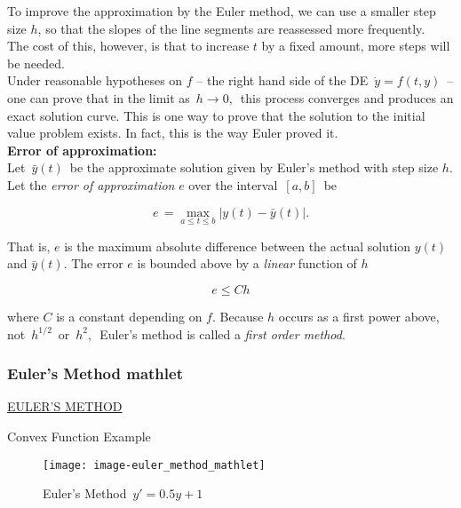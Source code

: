 To improve the approximation by the Euler method, we can use a smaller step size $h$,
so that the slopes of the line segments are reassessed more frequently. \\

The cost of this, however, is that to increase $t$ by a fixed amount, more steps will be needed. \\

Under reasonable hypotheses on $f$ – the right hand side of the DE $\, \dot y= f(t,y) \,$
– one can prove that in the limit as $\, h \to 0,\,$ this process converges and produces
an exact solution curve.
This is one way to prove that the solution to the initial value problem exists.
In fact, this is the way Euler proved it.\\

\textbf{Error of approximation:}\\
Let $\, \bar{y}(t)\,$ be the approximate solution given by Euler's method with step size $h$.\\
Let the \emph{\color{blue} error of approximation} $e$
over the interval $\, [a,b] \,$ be

\begin{equation*}
  e\, = \max _{a\leq t\leq b} \left|y(t)-\bar{y}(t)\right|.
\end{equation*}

That is, $e$ is the maximum absolute difference between the actual solution
$y(t)$ and $\bar{y} (t)$. The error $e$ is bounded above by a \emph{linear} function of $h$

\begin{equation*}
  e\leq C h
\end{equation*}

where $C$ is a constant depending on $f$.
Because $h$ occurs as a first power above, not $\, h^{1/2}\,$ or $\, h^2,\,$
Euler's method is called a \emph{\color{blue}first order method}.

\clearpage

\subsubsection{Euler's Method mathlet}

\href{http://mathlets.org/mathlets/eulers-method/}
{EULER'S METHOD}

\begin{exercise}
  Convex Function Example
\end{exercise}

\begin{figure}[ht!]
  \centering
  \texttt{[image: image-euler\_method\_mathlet]}
  \caption{Euler's Method $\, y' = 0.5y + 1$}
\end{figure}

